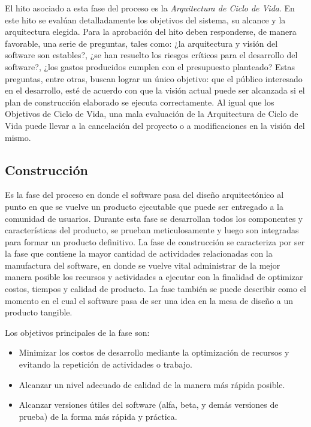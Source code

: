 El hito asociado a esta fase del proceso es la \textit{Arquitectura de Ciclo de Vida}. En este hito se evalúan detalladamente los objetivos del sistema, su alcance y la arquitectura elegida. Para la aprobación del hito deben responderse, de manera favorable, una serie de preguntas, tales como: ¿la arquitectura y visión del software son estables?, ¿se han resuelto los riesgos críticos para el desarrollo del software?, ¿los gastos producidos cumplen con el presupuesto planteado? Estas preguntas, entre otras, buscan lograr un único objetivo: que el público interesado en el desarrollo, esté de acuerdo con que la visión actual puede ser alcanzada si el plan de construcción elaborado se ejecuta correctamente. Al igual que los Objetivos de Ciclo de Vida, una mala evaluación de la Arquitectura de Ciclo de Vida puede llevar a la cancelación del proyecto o a modificaciones en la visión del mismo.

\subsection{Construcción}
Es la fase del proceso en donde el software pasa del diseño arquitectónico al punto en que se vuelve un producto ejecutable que puede ser entregado a la comunidad de usuarios. \cite{rupKruchten} Durante esta fase se desarrollan todos los componentes y características del producto, se prueban meticulosamente y luego son integradas para formar un producto definitivo. La fase de construcción se caracteriza por ser la fase que contiene la mayor cantidad de actividades relacionadas con la manufactura del software, en donde se vuelve vital administrar de la mejor manera posible los recursos y actividades a ejecutar con la finalidad de optimizar costos, tiempos y calidad de producto. La fase también se puede describir como el momento en el cual el software pasa de ser una idea en la mesa de diseño a un producto tangible.

Los objetivos principales de la fase son:

\begin{itemize}
    \item Minimizar los costos de desarrollo mediante la optimización de recursos y evitando la repetición de actividades o trabajo.
    \item Alcanzar un nivel adecuado de calidad de la manera más rápida posible.
    \item Alcanzar versiones útiles del software (alfa, beta, y demás versiones de prueba) de la forma más rápida y práctica.
\end{itemize}


